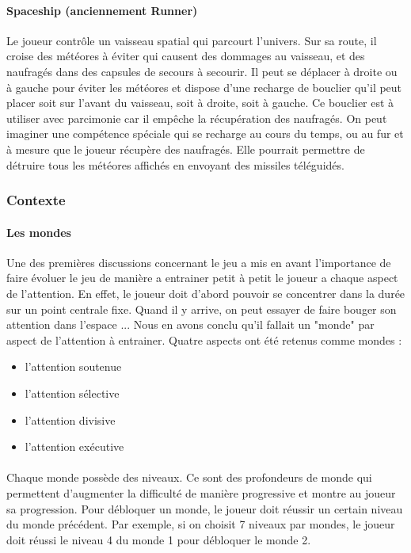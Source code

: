 \paragraph{Spaceship (anciennement Runner)}Le joueur contrôle un vaisseau spatial qui parcourt l'univers. Sur sa route, il croise des météores à éviter qui causent des dommages au
vaisseau, et des naufragés dans des capsules de secours à secourir. Il peut se déplacer à droite ou à gauche pour éviter les météores et dispose d'une recharge de bouclier qu'il peut
placer soit sur l'avant du vaisseau, soit à droite, soit à gauche. Ce bouclier est à utiliser avec parcimonie car il empêche la récupération des naufragés. On peut imaginer une
compétence spéciale qui se recharge au cours du temps, ou au fur et à mesure que le joueur récupère des naufragés. Elle pourrait permettre de détruire tous les météores affichés en
envoyant des missiles téléguidés.


\newpage
\subsubsection{Contexte}

\paragraph{Les mondes}Une des premières discussions concernant le jeu a mis en avant l'importance de faire évoluer le jeu de manière a entrainer petit à petit le joueur a chaque aspect
de l'attention. En effet, le joueur doit d'abord pouvoir se concentrer dans la durée sur un point centrale fixe. Quand il y arrive, on peut essayer de faire bouger son attention dans
l'espace ... Nous en avons conclu qu'il fallait un "monde" par aspect de l'attention à entrainer. Quatre aspects ont été retenus comme mondes :
\begin{itemize}
\item l'attention soutenue
\item l'attention sélective
\item l'attention divisive
\item l'attention exécutive
\end{itemize}

\paragraph{}Chaque monde possède des niveaux. Ce sont des profondeurs de monde qui permettent d'augmenter la difficulté de manière progressive et montre au joueur sa progression.
Pour débloquer un monde, le joueur doit réussir un certain niveau du monde précédent. Par exemple, si on choisit 7 niveaux par mondes, le joueur doit réussi le niveau 4 du monde 1
pour débloquer le monde 2.

